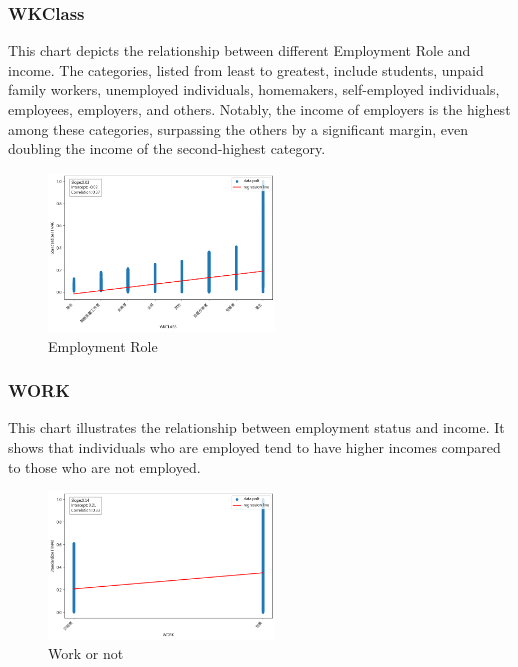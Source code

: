 \documentclass[twocolumn]{article}
\begin{document}
		\subsubsection{WKClass}
This chart depicts the relationship between different Employment Role and income. The categories, listed from least to greatest, include students, unpaid family workers, unemployed individuals, homemakers, self-employed individuals, employees, employers, and others. Notably, the income of employers is the highest among these categories, surpassing the others by a significant margin, even doubling the income of the second-highest category.
		\begin{figure}[H]
		\centering
		\includegraphics[width=6cm]{WKCLASS.png} 
		\caption{Employment Role} 
		\label{Fig.WKCLASS} 
		\end{figure}
		
		\subsubsection{WORK}
This chart illustrates the relationship between employment status and income. It shows that individuals who are employed tend to have higher incomes compared to those who are not employed.
		\begin{figure}[H]
		\centering
		\includegraphics[width=6cm]{WORK.png} 
		\caption{Work or not} 
		\label{Fig.WORK} 
		\end{figure}
\end{document}
